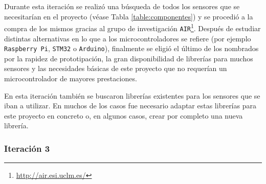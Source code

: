 Durante esta iteración se realizó una búsqueda de todos los sensores que se necesitarían en el proyecto (véase Tabla \ref{table:componentes}) y se procedió a la compra de los mismos gracias al grupo de investigación \texttt{AIR}\footnote{\url{http://air.esi.uclm.es/}}. Después de estudiar distintas alternativas en lo que a los microcontroladores se refiere (por ejemplo \texttt{Raspberry Pi}, \texttt{STM32} o \texttt{Arduino}), finalmente se eligió el último de los nombrados por la rapidez de prototipación, la gran disponibilidad de librerías para muchos sensores y las necesidades básicas de este proyecto que no requerían un microcontrolador de mayores prestaciones. 

En esta iteración también se buscaron librerías existentes para los sensores que se iban a utilizar. En muchos de los casos fue necesario adaptar estas librerías para este proyecto en concreto o, en algunos casos, crear por completo una nueva librería.

\subsubsection{Iteración 3}

